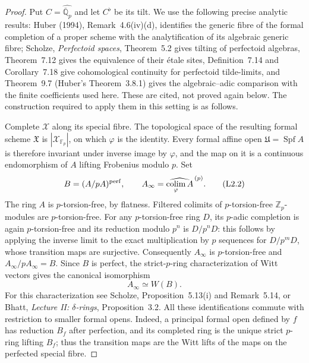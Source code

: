 \documentclass[11pt]{article}
\theoremstyle{remark}
\begin{document}
\begin{proof}
Put $C=\widehat{\overline{\mathbb Q}_p}$ and let $C^\flat$ be its tilt.
We use the following precise analytic results: Huber (1994),
Remark~4.6(iv)(d), identifies the generic fibre of the formal completion
of a proper scheme with the analytification of its algebraic generic
fibre; Scholze, \emph{Perfectoid spaces}, Theorem~5.2 gives tilting of
perfectoid algebras, Theorem~7.12 gives the equivalence of their
\'etale sites, Definition~7.14 and Corollary~7.18 give cohomological
continuity for perfectoid tilde-limits, and Theorem~9.7 (Huber's
Theorem~3.8.1) gives the algebraic--adic comparison with the finite
coefficients used here.  These are cited, not proved again below.
The construction required to apply them in this setting is as follows.

Complete $\mathcal X$ along its special fibre.  The topological
space of the resulting formal scheme $\mathfrak X$ is
$|\mathcal X_{\mathbb F_p}|$, on which $\varphi$ is the identity.
Every formal affine open $\mathfrak U=\operatorname{Spf}A$ is
therefore invariant under inverse image by $\varphi$, and the map on
it is a continuous endomorphism of $A$ lifting Frobenius modulo $p$.
Set
\[
 B=(A/pA)^{\mathrm{perf}},\qquad
 A_\infty=\widehat{\mathop{\rm colim}_{\varphi} A}^{\,(p)}.
 \tag{L2.2}
\]
The ring $A$ is $p$-torsion-free, by flatness.  Filtered colimits of
$p$-torsion-free $\mathbb Z_p$-modules are $p$-torsion-free.  For any
$p$-torsion-free ring $D$, its $p$-adic completion is again
$p$-torsion-free and its reduction modulo $p^n$ is $D/p^nD$: this
follows by applying the inverse limit to the exact multiplication by
$p$ sequences for $D/p^mD$, whose transition maps are surjective.
Consequently $A_\infty$ is $p$-torsion-free and
$A_\infty/pA_\infty=B$.  Since $B$ is perfect, the strict-$p$-ring
characterization of Witt vectors gives the canonical isomorphism
\[
 A_\infty\simeq W(B).
 \tag{L2.3}
\]
For this characterization see Scholze, Proposition~5.13(i) and
Remark~5.14, or Bhatt, \emph{Lecture II: $\delta$-rings},
Proposition~3.2.  All these identifications commute with restriction
to smaller formal opens.  Indeed, a principal formal open defined by
$f$ has reduction $B_f$ after perfection, and its completed ring is
the unique strict $p$-ring lifting $B_f$; thus the transition maps are
the Witt lifts of the maps on the perfected special fibre.


\end{proof}
\end{document}
